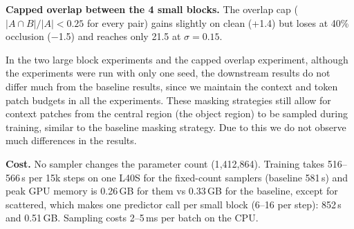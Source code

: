 \textbf{Capped overlap between the 4 small blocks.} The overlap cap ($|A\cap B|/|A|<0.25$ for every pair) gains slightly
on clean (+1.4) but loses at 40\% occlusion ($-$1.5) and reaches only 21.5 at $\sigma{=}0.15$. 

\spec In the two large block experiments and the capped overlap experiment, although the experiments were run with only one 
seed, the downstream results do not differ much from the baseline results, since we maintain the context and token patch budgets
in all the experiments. These masking strategies still allow for context patches from the central region (the object region)
to be sampled during training, similar to the baseline masking strategy. Due to this we do not observe much differences in the 
results.


\textbf{Cost.} No sampler changes the parameter count (1{,}412{,}864). Training takes 516--566\,s per 15k steps on one L40S for the fixed-count samplers (baseline 581\,s)
and peak GPU memory is 0.26\,GB for them vs 0.33\,GB for the baseline, except for scattered, which makes
one predictor call per small block (6--16 per step): 852\,s and 0.51\,GB. Sampling costs 2--5\,ms per batch on the CPU.
